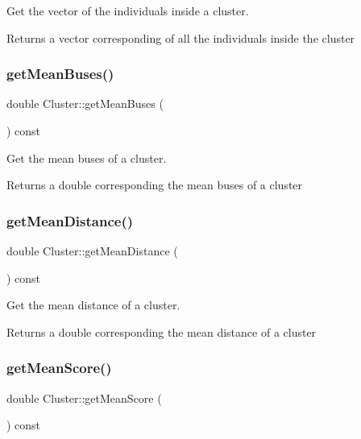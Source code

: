 Get the vector of the individuals inside a cluster. 

\begin{DoxyReturn}{Returns}
a vector corresponding of all the individuals inside the cluster 
\end{DoxyReturn}
\mbox{\label{class_cluster_a09609cb787d9f70321a1a8681bd775ad}} 
\subsubsection{\texorpdfstring{get\+Mean\+Buses()}{getMeanBuses()}}
{\footnotesize\ttfamily double Cluster\+::get\+Mean\+Buses (\begin{DoxyParamCaption}{ }\end{DoxyParamCaption}) const}



Get the mean buses of a cluster. 

\begin{DoxyReturn}{Returns}
a double corresponding the mean buses of a cluster 
\end{DoxyReturn}
\mbox{\label{class_cluster_adfc60f4505a0e78dc7a376bfafa0f352}} 
\subsubsection{\texorpdfstring{get\+Mean\+Distance()}{getMeanDistance()}}
{\footnotesize\ttfamily double Cluster\+::get\+Mean\+Distance (\begin{DoxyParamCaption}{ }\end{DoxyParamCaption}) const}



Get the mean distance of a cluster. 

\begin{DoxyReturn}{Returns}
a double corresponding the mean distance of a cluster 
\end{DoxyReturn}
\mbox{\label{class_cluster_af070716a9f6d89b07bfbdcffa3546d23}} 
\subsubsection{\texorpdfstring{get\+Mean\+Score()}{getMeanScore()}}
{\footnotesize\ttfamily double Cluster\+::get\+Mean\+Score (\begin{DoxyParamCaption}{ }\end{DoxyParamCaption}) const}



